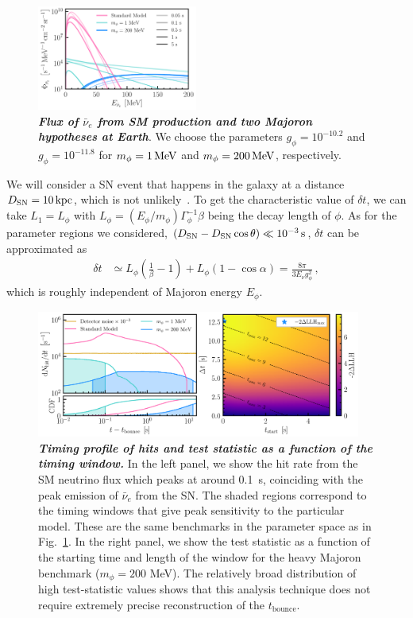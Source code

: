 \documentclass[aps,twocolumn,prl,showpacs,showkeys,preprintnumbers,superscriptaddress,nobibnotes,floatfix,longbibliography,notitlepage,nofootinbib]{revtex4-2}
\begin{document}
\begin{figure}[t!]
    \centering
    \includegraphics[width=0.47\textwidth]{figures/majoran_fluxes.pdf}
    \caption{\textit{\textbf{Flux of $\bar{\nu}_{e}$ from SM production and two Majoron hypotheses at Earth}}.
    We choose the parameters $g_\phi = 10^{-10.2}$ and $g_\phi = 10^{-11.8}$ for $m_\phi = \unit[1]{MeV}$ and $m_\phi = \unit[200]{MeV}$, respectively.
    }
    \label{fig:fluxes}
\end{figure}

We will consider a SN event that happens in the galaxy at a distance $D_{\rm SN}=\unit[10]{kpc}$, which is not unlikely~\cite{Reed:2005en,Rozwadowska:2020nab}. To get the characteristic value of $\delta t$, we can take $L_1 = L_\phi$ with $L_\phi = (E_\phi/m_\phi) \Gamma^{-1}_\phi \beta$ being the decay length of $\phi$.
As for the parameter regions we considered, $(D_{\rm SN} -D_{\rm SN} \cos\theta) \ll \unit[10^{-3}]{s}$, $\delta t$ can be approximated as
\begin{align}
    \delta t &\simeq L_\phi\left(\frac{1}{\beta} -1\right) + L_\phi(1-\cos\alpha) = \frac{8\pi}{3 E_{\nu}g_\phi^2}\,,
    \label{eq:deltat}
\end{align}
which is roughly independent of Majoron energy $E_\phi$.

\begin{figure}[t]
    \centering
    \includegraphics[width=0.95\textwidth]{figures/hits_and_likelihood.pdf}
    \caption{\textbf{\textit{Timing profile of hits and test statistic as a function of the timing window.}}
    In the left panel, we show the hit rate from the SM neutrino flux which peaks at around 0.1~s, coinciding with the peak emission of $\bar{\nu}_{e}$ from the SN. The shaded regions correspond to the timing windows that give peak sensitivity to the particular model. These are the same benchmarks in the parameter space as in Fig.~\ref{fig:fluxes}.
    In the right panel, we show the test statistic as a function of the starting time and length of the window for the heavy Majoron benchmark ($m_\phi=200$ MeV).
    The relatively broad distribution of high test-statistic values shows that this analysis technique does not require extremely precise reconstruction of the $t_{\mathrm{bounce}}$.
    }
    \label{fig:hits_and_likelihood}
\end{figure}
\end{document}
